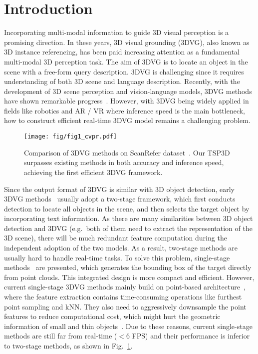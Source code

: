 \section{Introduction}
\label{sec:intro}

Incorporating multi-modal information to guide 3D visual perception is a promising direction. In these years, 3D visual grounding (3DVG), also known as 3D instance referencing, has been paid increasing attention as a fundamental multi-modal 3D perception task. The aim of 3DVG is to locate an object in the scene with a free-form query description. 3DVG is challenging since it requires understanding of both 3D scene and language description. Recently, with the development of 3D scene perception and vision-language models, 3DVG methods have shown remarkable progress~\citep{jain2022bottom,luo20223d}. However, with 3DVG being widely applied in fields like robotics and AR / VR where inference speed is the main bottleneck, how to construct efficient real-time 3DVG model remains a challenging problem. 

\begin{figure}
  \centering
  \texttt{[image: fig/fig1\_cvpr.pdf]}
  \vspace{-.2cm}
  \caption{Comparison of 3DVG methods on ScanRefer dataset~\citep{chen2020scanrefer}. Our TSP3D surpasses existing methods in both accuracy and inference speed, achieving the first efficient 3DVG framework.}
  \label{fig:your_label}
  \vspace{-.3cm}
\end{figure}

Since the output format of 3DVG is similar with 3D object detection, early 3DVG methods~\citep{yuan2021instancerefer,yang2021sat,chen2020scanrefer,
huang2021text} usually adopt a two-stage framework, which first conducts detection to locate all objects in the scene, and then selects the target object by incorporating text information. As there are many similarities between 3D object detection and 3DVG (e.g.\ both of them need to extract the representation of the 3D scene), there will be much redundant feature computation during the independent adoption of the two models. As a result, two-stage methods are usually hard to handle real-time tasks. To solve this problem, single-stage methods~\citep{luo20223d,wu2023eda} are presented, which generates the bounding box of the target directly from point clouds. This integrated design is more compact and efficient. However, current single-stage 3DVG methods mainly build on point-based architecture~\citep{qi2017pointnetpp}, where the feature extraction contains time-consuming operations like furthest point sampling and kNN. They also need to aggressively downsample the point features to reduce computational cost, which might hurt the geometric information of small and thin objects~\citep{xu2023dsp}. Due to these reasons, current single-stage methods are still far from real-time ($<6$ FPS) and their performance is inferior to two-stage methods, as shown in Fig.~\ref{fig:your_label}.

